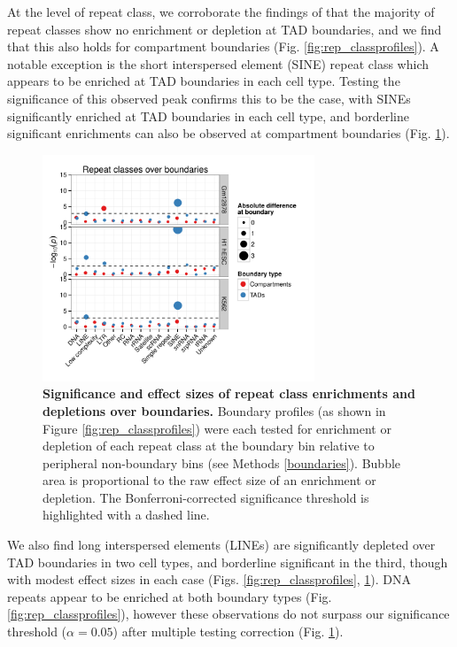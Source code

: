 \documentclass[a4paper,11pt,oneside]{book}
\begin{document}
At the level of repeat class, we corroborate the findings of \citet{Dixon2012} that the majority of repeat classes show no enrichment or depletion at TAD boundaries, and we find that this also holds for compartment boundaries (Fig. \ref{fig:rep_classprofiles}). A notable exception is the short interspersed element (SINE) repeat class which appears to be enriched at TAD boundaries in each cell type. Testing the significance of this observed peak confirms this to be the case, with SINEs significantly enriched at TAD boundaries in each cell type, and borderline significant enrichments can also be observed at compartment boundaries (Fig. \ref{fig:rep_classbubble}).

\begin{figure}
\begin{center} 
\includegraphics[width=3.2in]{rep_classbubble.pdf}
\captionsetup{width=\textwidth}
\caption[Significance and effect sizes of repeat class enrichments and depletions over boundaries.]{ {\bf Significance and effect sizes of repeat class enrichments and depletions over boundaries.}
Boundary profiles (as shown in Figure \ref{fig:rep_classprofiles}) were each tested for enrichment or depletion of each repeat class at the boundary bin relative to peripheral non-boundary bins (see Methods \ref{boundaries}). Bubble area is proportional to the raw effect size of an enrichment or depletion. The Bonferroni-corrected significance threshold is highlighted with a dashed line.
}\label{fig:rep_classbubble}
\end{center}
\end{figure} 

We also find long interspersed elements (LINEs) are significantly depleted over TAD boundaries in two cell types, and borderline significant in the third, though with modest effect sizes in each case (Figs. \ref{fig:rep_classprofiles}, \ref{fig:rep_classbubble}). DNA repeats appear to be enriched at both boundary types (Fig. \ref{fig:rep_classprofiles}), however these observations do not surpass our significance threshold ($\alpha = 0.05$) after multiple testing correction (Fig. \ref{fig:rep_classbubble}).
\end{document}
